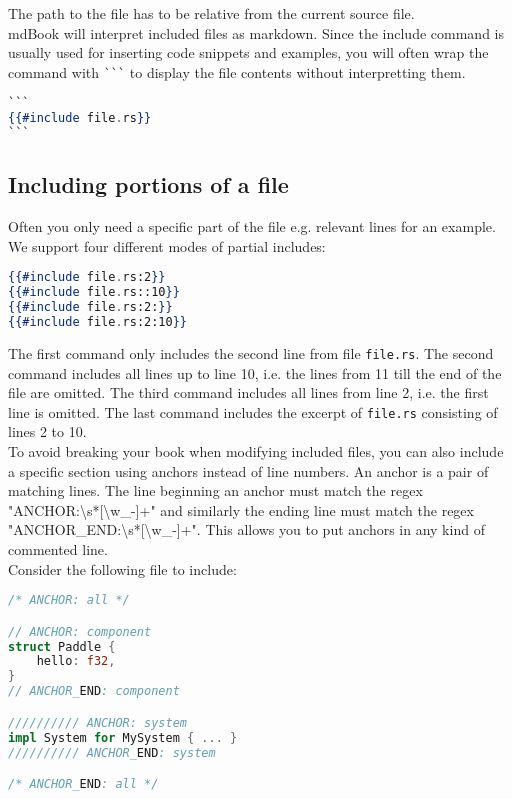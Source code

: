 \documentclass{article}
\begin{document}
The path to the file has to be relative from the current source file.\\

mdBook will interpret included files as markdown. Since the include command
is usually used for inserting code snippets and examples, you will often
wrap the command with \lstinline|```| to display the file contents without
interpretting them.\\
\begin{lstlisting}[language=hbs]
```
{{#include file.rs}}
```

\end{lstlisting}

\subsection{Including portions of a file}
\label{Including portions of a file}
\label{including-portions-of-a-file}

Often you only need a specific part of the file e.g. relevant lines for an
example. We support four different modes of partial includes:\\
\begin{lstlisting}[language=hbs]
{{#include file.rs:2}}
{{#include file.rs::10}}
{{#include file.rs:2:}}
{{#include file.rs:2:10}}

\end{lstlisting}

The first command only includes the second line from file \lstinline|file.rs|. The second
command includes all lines up to line 10, i.e. the lines from 11 till the end of
the file are omitted. The third command includes all lines from line 2, i.e. the
first line is omitted. The last command includes the excerpt of \lstinline|file.rs|
consisting of lines 2 to 10.\\

To avoid breaking your book when modifying included files, you can also
include a specific section using anchors instead of line numbers.
An anchor is a pair of matching lines. The line beginning an anchor must
match the regex "ANCHOR:\textbackslash{}s*[\textbackslash{}w\_-]+" and similarly the ending line must match
the regex "ANCHOR\_END:\textbackslash{}s*[\textbackslash{}w\_-]+". This allows you to put anchors in
any kind of commented line.\\

Consider the following file to include:\\
\begin{lstlisting}[language=rs]
/* ANCHOR: all */

// ANCHOR: component
struct Paddle {
    hello: f32,
}
// ANCHOR_END: component

////////// ANCHOR: system
impl System for MySystem { ... }
////////// ANCHOR_END: system

/* ANCHOR_END: all */

\end{lstlisting}
\end{document}
